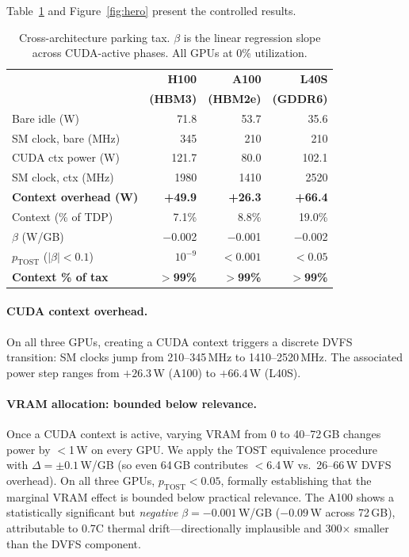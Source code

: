 \documentclass[sigconf,nonacm]{acmart}
\begin{document}
Table~\ref{tab:cross} and Figure~\ref{fig:hero} present the controlled results.

\begin{table}[t]
\caption{Cross-architecture parking tax. $\beta$ is the linear regression slope across CUDA-active phases. All GPUs at 0\% utilization.}
\label{tab:cross}
\small
\begin{tabular}{lrrr}
\toprule
 & \textbf{H100} & \textbf{A100} & \textbf{L40S} \\
 & \textbf{(HBM3)} & \textbf{(HBM2e)} & \textbf{(GDDR6)} \\
\midrule
Bare idle (W) & 71.8 & 53.7 & 35.6 \\
SM clock, bare (MHz) & 345 & 210 & 210 \\
CUDA ctx power (W) & 121.7 & 80.0 & 102.1 \\
SM clock, ctx (MHz) & 1980 & 1410 & 2520 \\
\midrule
\textbf{Context overhead (W)} & \textbf{+49.9} & \textbf{+26.3} & \textbf{+66.4} \\
Context (\% of TDP) & 7.1\% & 8.8\% & 19.0\% \\
\midrule
$\beta$ (W/GB) & $-$0.002 & $-$0.001 & $-$0.002 \\
$p_{\text{TOST}}$ ($|\beta| < 0.1$) & $10^{-9}$ & $<0.001$ & $<0.05$ \\
\textbf{Context \% of tax} & \textbf{$>$99\%} & \textbf{$>$99\%} & \textbf{$>$99\%} \\
\bottomrule
\end{tabular}
\end{table}

\paragraph{CUDA context overhead.} On all three GPUs, creating a CUDA context triggers a discrete DVFS transition: SM clocks jump from 210--345\,MHz to 1410--2520\,MHz. The associated power step ranges from $+26.3$\,W (A100) to $+66.4$\,W (L40S).

\paragraph{VRAM allocation: bounded below relevance.} Once a CUDA context is active, varying VRAM from 0 to 40--72\,GB changes power by $<$1\,W on every GPU. We apply the TOST equivalence procedure~\cite{schuirmann-tost} with $\Delta = \pm 0.1$\,W/GB (so even 64\,GB contributes $<$6.4\,W vs.\ 26--66\,W DVFS overhead). On all three GPUs, $p_{\text{TOST}} < 0.05$, formally establishing that the marginal VRAM effect is bounded below practical relevance. The A100 shows a statistically significant but \emph{negative} $\beta = -0.001$\,W/GB ($-0.09$\,W across 72\,GB), attributable to 0.7\textdegree C thermal drift---directionally implausible and 300$\times$ smaller than the DVFS component.
\end{document}
